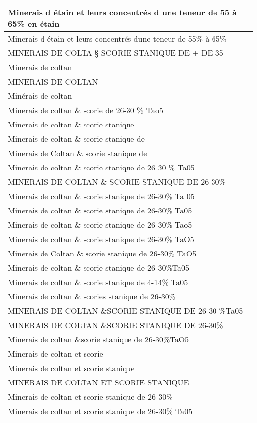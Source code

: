 \documentclass[
]{book}
\begin{document}
\begin{table}
\begin{tabular}[t]{l}
Minerais d étain et leurs concentrés d une teneur de 55 à 65\% en étain\\
\hline
Minerais d étain et leurs concentrés dune teneur de 55\% à 65\%\\
\hline
MINERAIS DE COLTA § SCORIE STANIQUE DE + DE 35\\
\hline
Minerais de coltan\\
\hline
MINERAIS DE COLTAN\\
\hline
Minérais de coltan\\
\hline
Minerais de coltan \& scorie de 26-30 \% Tao5\\
\hline
Minerais de coltan \& scorie stanique\\
\hline
Minerais de coltan \& scorie stanique de\\
\hline
Minerais de Coltan \& scorie stanique de\\
\hline
Minerais de coltan \& scorie stanique de 26-30 \% Ta05\\
\hline
MINERAIS DE COLTAN \& SCORIE STANIQUE DE 26-30\%\\
\hline
Minerais de coltan \& scorie stanique de 26-30\% Ta 05\\
\hline
Minerais de coltan \& scorie stanique de 26-30\% Ta05\\
\hline
Minerais de coltan \& scorie stanique de 26-30\% Tao5\\
\hline
Minerais de coltan \& scorie stanique de 26-30\% TaO5\\
\hline
Minerais de Coltan \& scorie stanique de 26-30\% TaO5\\
\hline
Minerais de coltan \& scorie stanique de 26-30\%Ta05\\
\hline
Minerais de coltan \& scorie stanique de 4-14\% Ta05\\
\hline
Minerais de coltan \& scories stanique de 26-30\%\\
\hline
MINERAIS DE COLTAN \&SCORIE STANIQUE DE 26-30 \%Ta05\\
\hline
MINERAIS DE COLTAN \&SCORIE STANIQUE DE 26-30\%\\
\hline
Minerais de coltan \&scorie stanique de 26-30\%TaO5\\
\hline
Minerais de coltan et scorie\\
\hline
Minerais de coltan et scorie stanique\\
\hline
MINERAIS DE COLTAN ET SCORIE STANIQUE\\
\hline
Minerais de coltan et scorie stanique de 26-30\%\\
\hline
Minerais de coltan et scorie stanique de 26-30\% Ta05\\

\end{tabular}
\end{table}
\end{document}
